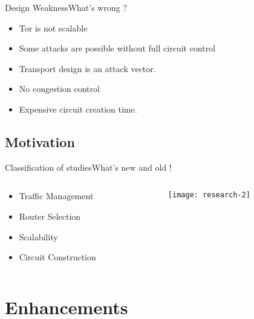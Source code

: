 \documentclass{beamer}
\begin{document}
\begin{frame}{Design Weakness}{What's wrong ?}
  \begin{itemize}
  \item Tor is not scalable
  \item Some attacks are possible without full circuit control
  \item Transport design is an attack vector.
  \item No congestion control
\item Expensive circuit creation time.
  \end{itemize}
\end{frame}


\subsection{Motivation}
\begin{frame}{Classification of studies}{What's new and old !}
\begin{columns}[T]
  \begin{column}{0.5\textwidth}

  \begin{itemize}
      \item Traffic Management
      \item Router Selection
      \item Scalability
      \item Circuit Construction
  \end{itemize}
  \end{column}
  \begin{column}{0.5\textwidth}
  \texttt{[image: research-2]}
  \end{column}
\end{columns}
\end{frame}

\section{Enhancements}
\end{document}
